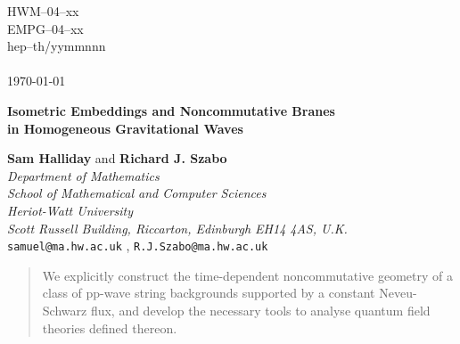 \documentclass[11pt,a4paper]{article}
\renewcommand{\thefootnote}{\fnsymbol{footnote}}
\begin{document}
\begin{titlepage}
\begin{flushright}

\baselineskip=12pt

HWM--04--xx\\
EMPG--04--xx\\
hep--th/yymmnnn\\
\hfill{ }\\
\today
\end{flushright}

\begin{center}

\vspace{2cm}

\baselineskip=24pt

{\Large\bf Isometric Embeddings and Noncommutative Branes \\
in Homogeneous Gravitational Waves}

\baselineskip=14pt

\vspace{1cm}

{\bf Sam Halliday} and {\bf Richard J. Szabo}
\\[4mm]
{\it Department of Mathematics\\ School of Mathematical and Computer
  Sciences\\ Heriot-Watt University\\ Scott Russell Building,
  Riccarton, Edinburgh EH14 4AS, U.K.}
\\{\tt samuel@ma.hw.ac.uk} , {\tt R.J.Szabo@ma.hw.ac.uk}
\\[40mm]

\end{center}

\begin{abstract}

\baselineskip=12pt

We explicitly construct the time-dependent noncommutative geometry of
a class of pp-wave string backgrounds supported by a constant Neveu-Schwarz
flux, and develop the necessary tools to analyse quantum field
theories defined thereon.

\end{abstract}

\end{titlepage}
\setcounter{page}{2}

\newpage

\renewcommand{\thefootnote}{\arabic{footnote}} \setcounter{footnote}{0}
\end{document}
